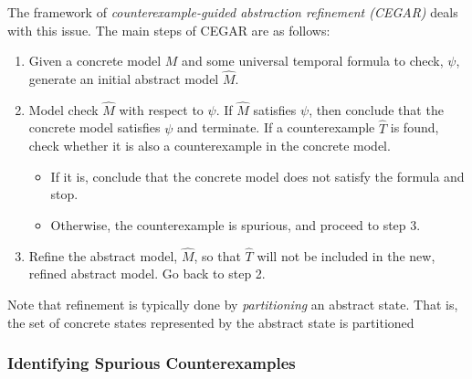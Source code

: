 \documentclass[10pt,a4paper]{article}
\begin{document}
The framework of \textit{counterexample-guided abstraction refinement (CEGAR)} deals with this issue. The main steps of CEGAR are as follows:
\begin{enumerate}
    \item Given a concrete model $M$ and some universal temporal formula to check, $\psi$, generate an initial abstract model $\widehat{M}$.
    \item Model check $\widehat{M}$ with respect to $\psi$. If $\widehat{M}$ satisfies $\psi$, then conclude that the concrete model satisfies $\psi$ and terminate. If a counterexample $\widehat{T}$ is found, check whether it is also a counterexample in the concrete model. 
    
    \begin{itemize}
        \item If it is, conclude that the concrete model does not satisfy the formula and stop.
        \item Otherwise, the counterexample is spurious, and proceed to step 3.
    \end{itemize}
    \item Refine the abstract model, $\widehat{M}$, so that $\widehat{T}$ will not be included in the new, refined abstract model. Go back to step 2.
\end{enumerate}

Note that refinement is typically done by \textit{partitioning} an abstract state. That is, the set of concrete states represented by the abstract state is partitioned

\subsubsection*{Identifying Spurious Counterexamples}
\end{document}
